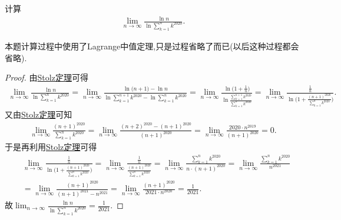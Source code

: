 \documentclass[../../main.tex]{subfiles}
\begin{document}
\begin{example}
计算
\begin{align*}
\lim_{n \to \infty} \frac{\ln n}{\ln \sum\limits_{k = 1}^{n} k^{2020}}.
\end{align*}
\end{example}
\begin{note}
本题计算过程中使用了Lagrange中值定理,只是过程省略了而已(以后这种过程都会省略).
\end{note}
\begin{proof}
由\hyperref[theorem:Stolz定理]{Stolz定理}可得
\begin{align*}
\lim_{n \to \infty} \frac{\ln n}{\ln \sum\limits_{k = 1}^{n} k^{2020}}=\lim_{n\rightarrow \infty} \frac{\ln\mathrm{(}n+1)-\ln n}{\ln \sum\limits_{k=1}^{n+1}{k^{2020}}-\ln \sum\limits_{k=1}^n{k^{2020}}}=\lim_{n\rightarrow \infty} \frac{\ln\mathrm{(}1+\frac{1}{n})}{\ln \frac{\sum\limits_{k=1}^{n+1}{k^{2020}}}{\sum\limits_{k=1}^n{k^{2020}}}}=\lim_{n\rightarrow \infty} \frac{\frac{1}{n}}{\ln\mathrm{(}1+\frac{(n+1)^{2020}}{\sum\limits_{k=1}^n{k^{2020}}})}.
\end{align*}
又由\hyperref[theorem:Stolz定理]{Stolz定理}可知
\begin{align*}
\lim_{n\rightarrow \infty} \frac{(n+1)^{2020}}{\sum\limits_{k=1}^n{k^{2020}}}=\lim_{n\rightarrow \infty} \frac{(n+2)^{2020}-(n+1)^{2020}}{(n+1)^{2020}}=\lim_{n\rightarrow \infty} \frac{2020\cdot n^{2019}}{(n+1)^{2020}}=0.
\end{align*}
于是再利用\hyperref[theorem:Stolz定理]{Stolz定理}可得
\begin{align*}
&\lim_{n\rightarrow \infty} \frac{\frac{1}{n}}{\ln\mathrm{(}1+\frac{(n+1)^{2020}}{\sum\limits_{k=1}^n{k^{2020}}})}=\lim_{n\rightarrow \infty} \frac{\frac{1}{n}}{\frac{(n+1)^{2020}}{\sum\limits_{k=1}^n{k^{2020}}}}=\lim_{n\rightarrow \infty} \frac{\sum\limits_{k=1}^n{k^{2020}}}{n\cdot (n+1)^{2020}}=\lim_{n\rightarrow \infty} \frac{\sum\limits_{k=1}^n{k^{2020}}}{n^{2021}}  \\
&=\lim_{n\rightarrow \infty} \frac{(n+1)^{2020}}{(n+1)^{2021}-n^{2021}}=\lim_{n\rightarrow \infty} \frac{(n+1)^{2020}}{2021\cdot n^{2020}}=\frac{1}{2021}.
\end{align*}
故$\lim_{n \to \infty} \frac{\ln n}{\ln \sum\limits_{k = 1}^{n} k^{2020}}=\frac{1}{2021}$.
\end{proof}
\end{document}

